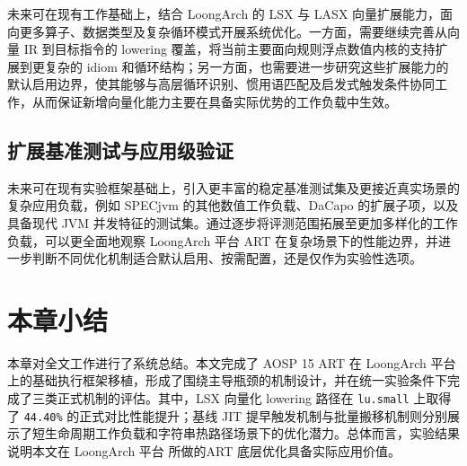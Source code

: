 未来可在现有工作基础上，结合 LoongArch 的 LSX 与 LASX 向量扩展能力，面向更多算子、数据类型及复杂循环模式开展系统优化。一方面，需要继续完善从向量 IR 到目标指令的 lowering 覆盖，将当前主要面向规则浮点数值内核的支持扩展到更复杂的 idiom 和循环结构；另一方面，也需要进一步研究这些扩展能力的默认启用边界，使其能够与高层循环识别、惯用语匹配及启发式触发条件协同工作，从而保证新增向量化能力主要在具备实际优势的工作负载中生效\citep{LoongArchISAv2,LoongArchToolchain2025}。

\subsection{扩展基准测试与应用级验证}

未来可在现有实验框架基础上，引入更丰富的稳定基准测试集及更接近真实场景的复杂应用负载，例如 SPECjvm 的其他数值工作负载、DaCapo 的扩展子项，以及具备现代 JVM 并发特征的测试集。通过逐步将评测范围拓展至更加多样化的工作负载，可以更全面地观察 LoongArch 平台 ART 在复杂场景下的性能边界，并进一步判断不同优化机制适合默认启用、按需配置，还是仅作为实验性选项\citep{Prokopec2019Renaissance}。

\section{本章小结}

本章对全文工作进行了系统总结。本文完成了 AOSP 15 ART 在 LoongArch 平台上的基础执行框架移植，形成了围绕主导瓶颈的机制设计，并在统一实验条件下完成了三类正式机制的评估。其中，LSX 向量化 lowering 路径在 \texttt{lu.small} 上取得了 \texttt{44.40\%} 的正式对比性能提升；基线 JIT 提早触发机制与批量搬移机制则分别展示了短生命周期工作负载和字符串热路径场景下的优化潜力。总体而言，实验结果说明本文在 LoongArch 平台 所做的ART 底层优化具备实际应用价值。
